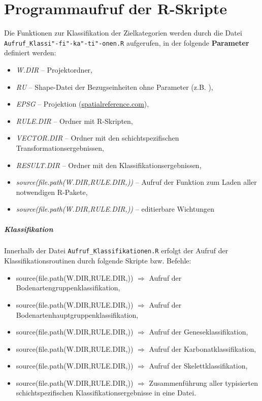 \section{Programmaufruf der R-Skripte}
Die Funktionen zur Klassifikation der Zielkategorien werden durch die Datei 
\texttt{Aufruf\_Klassi"-fi"-ka"-ti"-onen.R} aufgerufen, in der folgende \textbf{Parameter} definiert werden:

\begin{itemize}
\item \textit{W.DIR} -- Projektordner,
\item \textit{RU} -- Shape-Datei der Bezugseinheiten ohne Parameter (z.B. ),
\item \textit{EPSG} -- Projektion (\url{spatialreference.com}),
\item \textit{RULE.DIR} -- Ordner mit R-Skripten,
\item \textit{VECTOR.DIR} -- Ordner mit den schichtspezifischen Transformationsergebnissen, 
\item \textit{RESULT.DIR} -- Ordner mit den Klassifikationsergebnissen,
\item \textit{source(file.path(W.DIR,RULE.DIR,))} -- Aufruf der Funktion zum Laden aller notwendigen R-Pakete,
\item \textit{source(file.path(W.DIR,RULE.DIR,))} -- 
editierbare Wichtungen
\end{itemize}

\subparagraph*{Klassifikation}
Innerhalb der Datei \texttt{Aufruf\_Klassifikationen.R} erfolgt der Aufruf der Klassifikationsroutinen durch folgende Skripte bzw. Befehle: 
\begin{itemize}
\item source(file.path(W.DIR,RULE.DIR,)) $\Rightarrow$ Aufruf der Bodenartengruppenklassifikation,
\item source(file.path(W.DIR,RULE.DIR,)) $\Rightarrow$ Aufruf der Bodenartenhauptgruppenklassifikation,
\item source(file.path(W.DIR,RULE.DIR,)) $\Rightarrow$ Aufruf der Geneseklassifikation,
\item source(file.path(W.DIR,RULE.DIR,)) $\Rightarrow$ Aufruf der Karbonatklassifikation,
\item source(file.path(W.DIR,RULE.DIR,)) $\Rightarrow$ Aufruf der Skelettklassifikation,
\item source(file.path(W.DIR,RULE.DIR,)) $\Rightarrow$ Zusammenführung aller typisierten schichtspezifischen Klassifikationsergebnisse in eine Datei.
\end{itemize}

